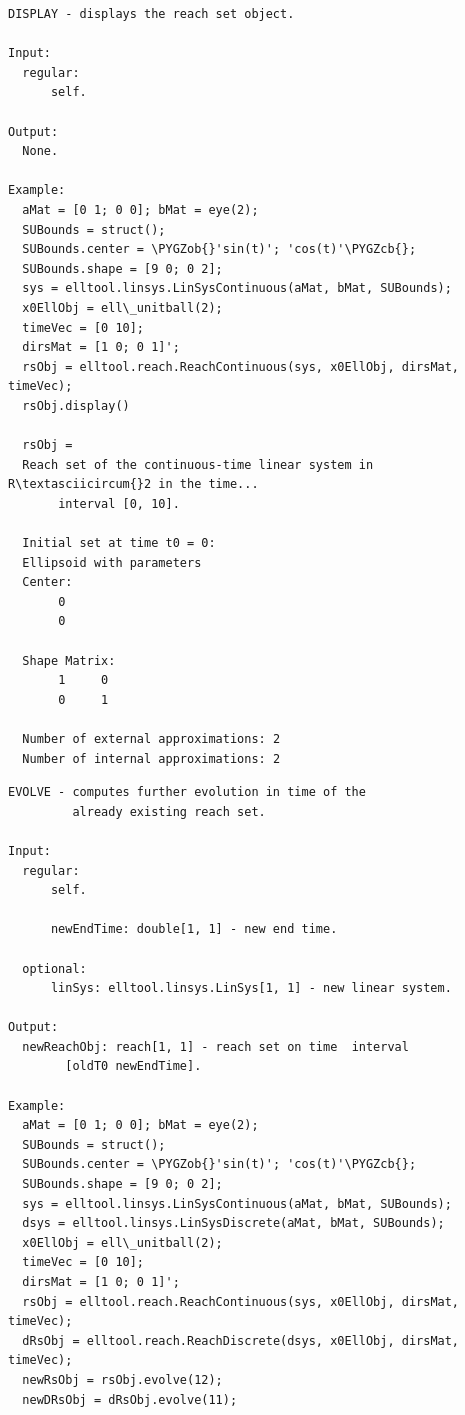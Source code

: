 \documentclass[letterpaper,10pt,english]{sphinxmanual}
\def\PYGZob{\char`\{}
\def\PYGZcb{\char`\}}
\begin{document}
\label{chap_func:elltool-reach-areach-display}
\begin{Verbatim}[commandchars=\\\{\}]
DISPLAY - displays the reach set object.

Input:
  regular:
      self.

Output:
  None.

Example:
  aMat = [0 1; 0 0]; bMat = eye(2);
  SUBounds = struct();
  SUBounds.center = \PYGZob{}'sin(t)'; 'cos(t)'\PYGZcb{};
  SUBounds.shape = [9 0; 0 2];
  sys = elltool.linsys.LinSysContinuous(aMat, bMat, SUBounds);
  x0EllObj = ell\_unitball(2);
  timeVec = [0 10];
  dirsMat = [1 0; 0 1]';
  rsObj = elltool.reach.ReachContinuous(sys, x0EllObj, dirsMat, timeVec);
  rsObj.display()

  rsObj =
  Reach set of the continuous-time linear system in R\textasciicircum{}2 in the time...
       interval [0, 10].

  Initial set at time t0 = 0:
  Ellipsoid with parameters
  Center:
       0
       0

  Shape Matrix:
       1     0
       0     1

  Number of external approximations: 2
  Number of internal approximations: 2
\end{Verbatim}
\label{chap_func:elltool-reach-areach-evolve}
\begin{Verbatim}[commandchars=\\\{\}]
EVOLVE - computes further evolution in time of the
         already existing reach set.

Input:
  regular:
      self.

      newEndTime: double[1, 1] - new end time.

  optional:
      linSys: elltool.linsys.LinSys[1, 1] - new linear system.

Output:
  newReachObj: reach[1, 1] - reach set on time  interval
        [oldT0 newEndTime].

Example:
  aMat = [0 1; 0 0]; bMat = eye(2);
  SUBounds = struct();
  SUBounds.center = \PYGZob{}'sin(t)'; 'cos(t)'\PYGZcb{};
  SUBounds.shape = [9 0; 0 2];
  sys = elltool.linsys.LinSysContinuous(aMat, bMat, SUBounds);
  dsys = elltool.linsys.LinSysDiscrete(aMat, bMat, SUBounds);
  x0EllObj = ell\_unitball(2);
  timeVec = [0 10];
  dirsMat = [1 0; 0 1]';
  rsObj = elltool.reach.ReachContinuous(sys, x0EllObj, dirsMat, timeVec);
  dRsObj = elltool.reach.ReachDiscrete(dsys, x0EllObj, dirsMat, timeVec);
  newRsObj = rsObj.evolve(12);
  newDRsObj = dRsObj.evolve(11);
\end{Verbatim}
\end{document}
